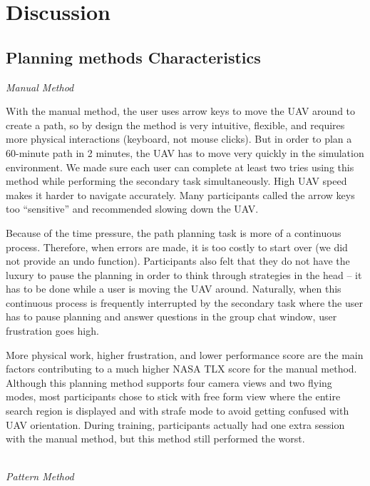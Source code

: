 \section{Discussion} 
\label{sec:Discussion}

\subsection{Planning methods Characteristics}

\noindent \textit{Manual Method}

With the manual method, the user uses arrow keys to move the UAV around to create a path, so by design the method is very intuitive, flexible, and requires more physical interactions (keyboard, not mouse clicks). But in order to plan a 60-minute path in 2 minutes, the UAV has to move very quickly in the simulation environment. We made sure each user can complete at least two tries using this method while performing the secondary task simultaneously. High UAV speed makes it harder to navigate accurately. Many participants called the arrow keys too ``sensitive'' and recommended slowing down the UAV. 

Because of the time pressure, the path planning task is more of a continuous process. Therefore, when errors are made, it is too costly to start over (we did not provide an undo function). Participants also felt that they do not have the luxury to pause the planning in order to think through strategies in the head -- it has to be done while a user is moving the UAV around. Naturally, when this continuous process is frequently interrupted by the secondary task where the user has to pause planning and answer questions in the group chat window, user frustration goes high. 

More physical work, higher frustration, and lower performance score are the main factors contributing to a much higher NASA TLX score for the manual method. Although this planning method supports four camera views and two flying modes, most participants chose to stick with free form view where the entire search region is displayed and with strafe mode to avoid getting confused with UAV orientation. During training, participants actually had one extra session with the manual method, but this method still performed the worst.

~\\ \noindent \textit{Pattern Method}

